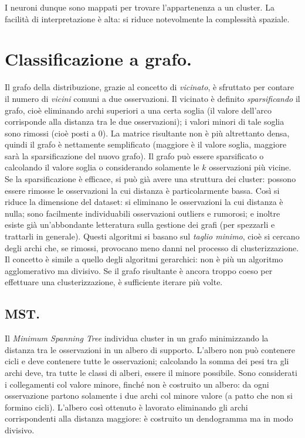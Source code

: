 \documentclass[11pt, a4page, twocolumn]{article}
\begin{document}
I neuroni dunque sono mappati per trovare l'appartenenza a un cluster.
La facilità di interpretazione è alta: si riduce notevolmente la complessità spaziale.

\section{Classificazione a grafo.}
Il grafo della distribuzione, grazie al concetto di \textit{vicinato}, è sfruttato per contare il numero di \textit{vicini} comuni a due osservazioni.
Il vicinato è definito \textit{sparsificando} il grafo, cioè eliminando archi superiori a una certa soglia (il valore dell'arco corrisponde alla distanza tra le due osservazioni); i valori minori di tale soglia sono rimossi (cioè posti a 0).
La matrice risultante non è più altrettanto densa, quindi il grafo è nettamente semplificato (maggiore è il valore soglia, maggiore sarà la sparsificazione del nuovo grafo). \newline
Il grafo può essere sparsificato o calcolando il valore soglia o considerando solamente le $k$ osservazioni più vicine.
Se la sparsificazione è efficace, si può già avere una struttura dei cluster: possono essere rimosse le osservazioni la cui distanza è particolarmente bassa.
Così si riduce la dimensione del dataset: si eliminano le osservazioni la cui distanza è nulla; sono facilmente individuabili osservazioni outliers e rumorosi; e inoltre esiste già un'abbondante letteratura sulla gestione dei grafi (per spezzarli e trattarli in generale).
Questi algoritmi si basano sul \textit{taglio minimo}, cioè si cercano degli archi che, se rimossi, provocano meno danni nel processo di clusterizzazione.
Il concetto è simile a quello degli algoritmi gerarchici: non è più un algoritmo agglomerativo ma divisivo.
Se il grafo risultante è ancora troppo coeso per effettuare una clusterizzazione, è sufficiente iterare più volte. \newline

\subsection{MST.}
Il \textit{Minimum Spanning Tree} individua cluster in un grafo minimizzando la distanza tra le osservazioni in un albero di supporto.
L'albero non può contenere cicli e deve contenere tutte le osservazioni; calcolando la somma dei pesi tra gli archi deve, tra tutte le classi di alberi, essere il minore possibile.
Sono considerati i collegamenti col valore minore, finché non è costruito un albero: da ogni osservazione partono solamente i due archi col minore valore (a patto che non si formino cicli).
L'albero così ottenuto è lavorato eliminando gli archi corrispondenti alla distanza maggiore: è costruito un dendogramma ma in modo divisivo.
\end{document}
